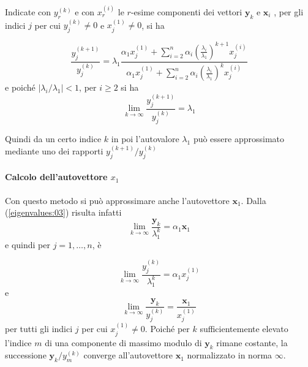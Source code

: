 Indicate con $y_r^{(k)}$ e con $x_r^{(i)}$ le $r$-esime componenti dei vettori
$\mathbf{y}_k$ e $\mathbf{x}_i$ , per gli indici $j$ per cui $y_j^{(k)} \neq 0$ e
$x_j^{(1)} \neq 0$, si ha

\begin{equation}
\label{eigenvalues:06}
\frac{y_j^{(k+1)}}{y_j^{(k)}} =
 \lambda_1
\frac{\alpha_1 x_j^{(1)} + \displaystyle \sum_{i=2}^{n} \alpha_i
\left( \frac{\lambda_i}{\lambda_1} \right)^{k+1} x_j^{(i)}
}{\alpha_1 x_j^{(1)} + \displaystyle \sum_{i=2}^{n} \alpha_i
\left( \frac{\lambda_i}{\lambda_1} \right)^{k} x_j^{(i)}
}
\end{equation}
e poich\'e $|\lambda_i / \lambda_1| < 1 $, per $i \geq 2$ si ha
$$ \lim_{k \to \infty}  \dfrac{y_j^{(k+1)}}{y_j^{(k)}} =  \lambda_1 $$

Quindi da un certo indice $k$ in poi l'autovalore $\lambda_1$ pu\`o
essere approssimato mediante uno dei rapporti
$y_j^{(k+1)} / y_j^{(k)}$ 


\paragraph{Calcolo dell'autovettore $x_1$}
Con questo metodo si pu\`o approssimare anche l'autovettore $\mathbf{x}_1$.
Dalla (\ref{eigenvalues:03}) risulta infatti
$$
\lim_{k \to \infty} \dfrac{\mathbf{y}_k}{\lambda_1^{k}} = \alpha_1 \mathbf{x}_1
$$
e quindi per $j=1, \ldots, n$, \`e

$$
\lim_{k \to \infty} \dfrac{y_j^{(k)}}{\lambda_1^{k}} = \alpha_1 x_j^{(1)}
$$
e
\begin{equation}
  \label{eigenvalues:04}
  \lim_{k \to \infty} \dfrac{\mathbf{y}_k}{y_j^{(k)}} =  \dfrac{\mathbf{x}_1}{x_j^{(1)}}
\end{equation}
per tutti gli indici $j$ per cui $x_j^{(1)} \neq 0$. Poich\'e per $k$
sufficientemente elevato l'indice $m$ di una componente di massimo modulo di
$\mathbf{y}_k$ rimane costante, la successione $\mathbf{y}_k / y_m^{(k)}$ converge
all'autovettore $\mathbf{x}_1$ normalizzato in norma $\infty$.

